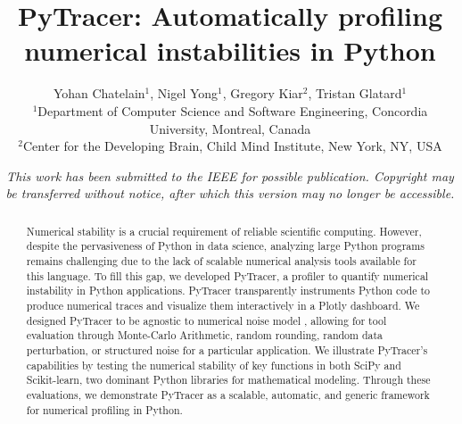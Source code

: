 \documentclass[11pt]{article}
\newcommand{\tristan}[1]{\color{orange}\textbf{From Tristan:} #1\color{black}\xspace}
\newcommand{\pytracer}[0]{PyTracer\xspace}
\begin{document}
\makeatletter
\let\orig@lstnumber=\thelstnumber
\newcommand\lstsetnumber[1]{\gdef\thelstnumber{#1}}
\newcommand\lstresetnumber{\global\let\thelstnumber=\orig@lstnumber}
\makeatother

\title{PyTracer: Automatically profiling numerical instabilities in Python}
\author{Yohan Chatelain$^1$, Nigel Yong$^1$,  Gregory Kiar$^2$,  Tristan Glatard$^1$\\
$^1$Department of Computer Science and Software Engineering, Concordia University, Montreal, Canada\\
$^2$Center for the Developing Brain, Child Mind Institute, New York, NY, USA}
\date{\textit{This work has been submitted to the IEEE for possible publication. 
Copyright may be transferred without notice, after which this version may no 
longer be accessible.}}
\maketitle


\begin{abstract}
Numerical stability is a crucial requirement of reliable scientific computing. However, despite the pervasiveness of Python in data science, analyzing large Python programs remains challenging due to the lack of scalable numerical analysis tools available for this language. To fill this gap, we developed \pytracer, a profiler to quantify numerical instability in Python applications. \pytracer transparently instruments Python code to produce numerical traces and visualize them interactively in a Plotly dashboard. We designed \pytracer to be agnostic to numerical noise model , allowing for tool evaluation through Monte-Carlo Arithmetic, random rounding, random data perturbation, or structured noise for a particular application. We illustrate \pytracer's capabilities by testing the numerical stability of key functions in both SciPy and Scikit-learn, two dominant Python libraries for mathematical modeling. Through these evaluations, we demonstrate \pytracer as a scalable, automatic, and generic framework for numerical profiling in Python.
\end{abstract}
\end{document}
